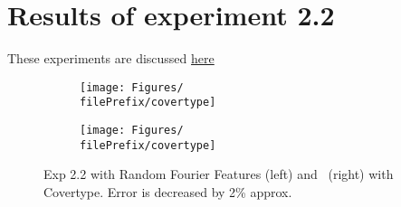 
\newcommand{\major}{2}
\newcommand{\minor}{2}

\newcommand{\undPrefix}{\major_\minor}
\newcommand{\dotPrefix}{\major.\minor}
\newcommand{\scoPrefix}{\major-\minor}
\newcommand{\filePrefix}{\undPrefix/rff}

\chapter{Results of experiment \dotPrefix} %


\label{Appendix\scoPrefix} %
These experiments are discussed \hyperref[disc:h2]{here}



\begin{figure}[H]
  \centering
  \renewcommand{\filePrefix}{\undPrefix/rff}
  \begin{subfigure}[t]{0.5\linewidth}
    \centering
    \texttt{[image: Figures/\\filePrefix/covertype]}
    \label{fig:\undPrefix_covertype}
  \end{subfigure}%
  \renewcommand{\filePrefix}{\undPrefix/nys}%
  \begin{subfigure}[t]{0.5\linewidth}
    \centering
    \texttt{[image: Figures/\\filePrefix/covertype]}
    \label{fig:\undPrefix_covertype}
  \end{subfigure}%
  \caption*{Exp 2.2 with Random Fourier Features (left) and \Nys\
  (right) with Covertype. Error is decreased by 2\% approx.}
\end{figure}

